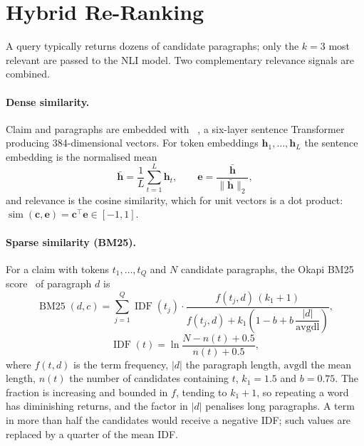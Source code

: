 \section{Hybrid Re-Ranking}
\label{sec:rerank}

A query typically returns dozens of candidate paragraphs; only the $k = 3$ most relevant are passed to the NLI model. Two complementary relevance signals are combined.

\paragraph{Dense similarity.} Claim and paragraphs are embedded with ~\citep{reimers2019sbert}, a six-layer sentence Transformer producing 384-dimensional vectors. For token embeddings $\mathbf{h}_1, \dots, \mathbf{h}_L$ the sentence embedding is the normalised mean
\begin{equation}
  \bar{\mathbf{h}} = \frac{1}{L} \sum_{t=1}^{L} \mathbf{h}_t, \qquad \mathbf{e} = \frac{\bar{\mathbf{h}}}{\lVert \bar{\mathbf{h}} \rVert_2},
\end{equation}
and relevance is the cosine similarity, which for unit vectors is a dot product: $\operatorname{sim}(\mathbf{c}, \mathbf{e}) = \mathbf{c}^\top \mathbf{e} \in [-1, 1]$.

\paragraph{Sparse similarity (BM25).} For a claim with tokens $t_1, \dots, t_Q$ and $N$ candidate paragraphs, the Okapi BM25 score~\citep{robertson2009bm25} of paragraph $d$ is
\begin{equation}
  \operatorname{BM25}(d, c) = \sum_{j=1}^{Q} \operatorname{IDF}(t_j) \cdot \frac{f(t_j, d)\,(k_1 + 1)}{f(t_j, d) + k_1 \left( 1 - b + b\, \dfrac{\lvert d \rvert}{\text{avgdl}} \right)},
\end{equation}
\begin{equation}
  \operatorname{IDF}(t) = \ln \frac{N - n(t) + 0.5}{n(t) + 0.5},
\end{equation}
where $f(t, d)$ is the term frequency, $\lvert d \rvert$ the paragraph length, $\text{avgdl}$ the mean length, $n(t)$ the number of candidates containing $t$, $k_1 = 1.5$ and $b = 0.75$. The fraction is increasing and bounded in $f$, tending to $k_1 + 1$, so repeating a word has diminishing returns, and the factor in $\lvert d \rvert$ penalises long paragraphs. A term in more than half the candidates would receive a negative IDF; such values are replaced by a quarter of the mean IDF.

